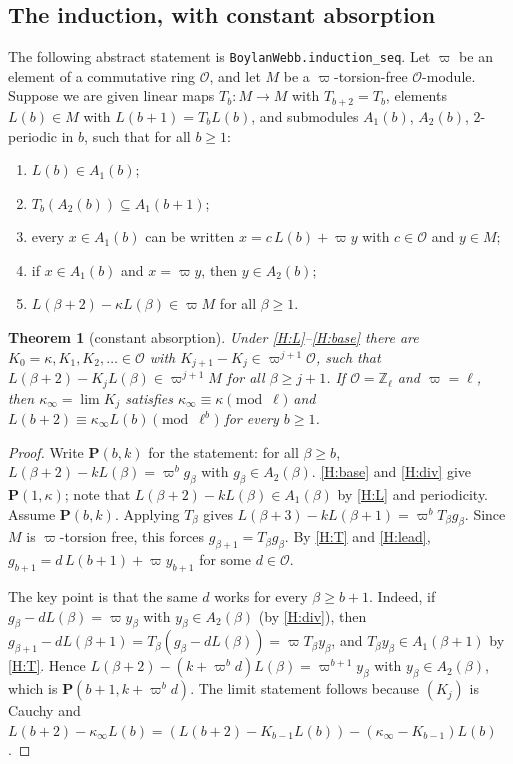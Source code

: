 \documentclass[11pt]{amsart}
\newcommand{\Zl}{\mathbb{Z}_\ell}
\newcommand{\lean}[1]{\texttt{#1}}
\theoremstyle{plain}
\newtheorem{theorem}{Theorem}[section]
\theoremstyle{definition}
\numberwithin{equation}{section}
\begin{document}
\subsection{The induction, with constant absorption}
The following abstract statement is \lean{BoylanWebb.induction\_seq}. Let $\varpi$ be an element of a commutative ring $\mathcal{O}$,
and let $M$ be a $\varpi$-torsion-free $\mathcal O$-module. Suppose we are given linear maps $T_b:M\to M$ with $T_{b+2}=T_b$,
elements $L(b)\in M$ with $L(b+1)=T_bL(b)$, and submodules $A_1(b)$, $A_2(b)$, $2$-periodic in $b$, such that for all $b\ge1$:
\begin{enumerate}[label=(H\arabic*)]
\item\label{H:L} $L(b)\in A_1(b)$;
\item\label{H:T} $T_b(A_2(b))\subseteq A_1(b+1)$;
\item\label{H:lead} every $x\in A_1(b)$ can be written $x=c\,L(b)+\varpi y$ with $c\in\mathcal O$ and $y\in M$;
\item\label{H:div} if $x\in A_1(b)$ and $x=\varpi y$, then $y\in A_2(b)$;
\item\label{H:base} $L(\beta+2)-\kappa L(\beta)\in\varpi M$ for all $\beta\ge1$.
\end{enumerate}

\begin{theorem}[constant absorption]\label{thm:induction}
Under \ref{H:L}--\ref{H:base} there are $K_0=\kappa,K_1,K_2,\dots\in\mathcal O$ with
$K_{j+1}-K_j\in\varpi^{j+1}\mathcal O$, such that $L(\beta+2)-K_jL(\beta)\in\varpi^{j+1}M$ for all $\beta\ge j+1$.
If $\mathcal O=\Zl$ and $\varpi=\ell$, then $\kappa_\infty=\lim K_j$ satisfies $\kappa_\infty\equiv\kappa\pmod\ell$ and
$L(b+2)\equiv\kappa_\infty L(b)\pmod{\ell^b}$ for every $b\ge1$.
\end{theorem}
\begin{proof}
Write $\mathbf P(b,k)$ for the statement: for all $\beta\ge b$, $L(\beta+2)-kL(\beta)=\varpi^b g_\beta$ with $g_\beta\in A_2(\beta)$.
\ref{H:base} and \ref{H:div} give $\mathbf P(1,\kappa)$; note that $L(\beta+2)-kL(\beta)\in A_1(\beta)$ by \ref{H:L} and
periodicity. Assume $\mathbf P(b,k)$. Applying $T_\beta$ gives
$L(\beta+3)-kL(\beta+1)=\varpi^bT_\beta g_\beta$. Since $M$ is $\varpi$-torsion free, this forces $g_{\beta+1}=T_\beta g_\beta$.
By \ref{H:T} and \ref{H:lead}, $g_{b+1}=d\,L(b+1)+\varpi y_{b+1}$ for some $d\in\mathcal{O}$.

The key point is that the same $d$ works for every $\beta\ge b+1$. Indeed, if $g_\beta-dL(\beta)=\varpi y_\beta$ with
$y_\beta\in A_2(\beta)$ (by \ref{H:div}), then
$g_{\beta+1}-dL(\beta+1)=T_\beta(g_\beta-dL(\beta))=\varpi T_\beta y_\beta$, and $T_\beta y_\beta\in A_1(\beta+1)$ by \ref{H:T}.
Hence $L(\beta+2)-(k+\varpi^bd)L(\beta)=\varpi^{b+1}y_\beta$ with $y_\beta\in A_2(\beta)$, which is $\mathbf P(b+1,k+\varpi^bd)$.
The limit statement follows because $(K_j)$ is Cauchy and $L(b+2)-\kappa_\infty L(b)=(L(b+2)-K_{b-1}L(b))-(\kappa_\infty-K_{b-1})L(b)$.
\end{proof}
\end{document}
